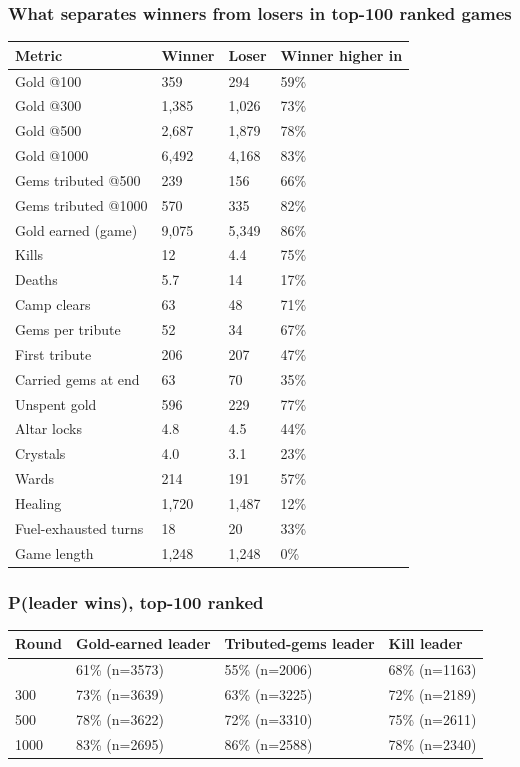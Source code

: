 \documentclass[
  10pt,
]{article}
\newcounter{none} %
\begin{document}
\subsubsection{What separates winners from losers in top-100 ranked
games}\label{what-separates-winners-from-losers-in-top-100-ranked-games-1}

{\def\LTcaptype{none} %
\begin{longtable}[]{@{}llll@{}}
\toprule\noalign{}
Metric & Winner & Loser & Winner higher in \\
\midrule\noalign{}
\endhead
\bottomrule\noalign{}
\endlastfoot
Gold @100 & 359 & 294 & 59\% \\
Gold @300 & 1,385 & 1,026 & 73\% \\
Gold @500 & 2,687 & 1,879 & 78\% \\
Gold @1000 & 6,492 & 4,168 & 83\% \\
Gems tributed @500 & 239 & 156 & 66\% \\
Gems tributed @1000 & 570 & 335 & 82\% \\
Gold earned (game) & 9,075 & 5,349 & 86\% \\
Kills & 12 & 4.4 & 75\% \\
Deaths & 5.7 & 14 & 17\% \\
Camp clears & 63 & 48 & 71\% \\
Gems per tribute & 52 & 34 & 67\% \\
First tribute & 206 & 207 & 47\% \\
Carried gems at end & 63 & 70 & 35\% \\
Unspent gold & 596 & 229 & 77\% \\
Altar locks & 4.8 & 4.5 & 44\% \\
Crystals & 4.0 & 3.1 & 23\% \\
Wards & 214 & 191 & 57\% \\
Healing & 1,720 & 1,487 & 12\% \\
Fuel-exhausted turns & 18 & 20 & 33\% \\
Game length & 1,248 & 1,248 & 0\% \\
\end{longtable}
}

\subsubsection{P(leader wins), top-100
ranked}\label{pleader-wins-top-100-ranked-1}

{\def\LTcaptype{none} %
\begin{longtable}[]{@{}llll@{}}
\toprule\noalign{}
Round & Gold-earned leader & Tributed-gems leader & Kill leader \\
\midrule\noalign{}
\endhead
\bottomrule\noalign{}
\endlastfoot
100 & 61\% (n=3573) & 55\% (n=2006) & 68\% (n=1163) \\
300 & 73\% (n=3639) & 63\% (n=3225) & 72\% (n=2189) \\
500 & 78\% (n=3622) & 72\% (n=3310) & 75\% (n=2611) \\
1000 & 83\% (n=2695) & 86\% (n=2588) & 78\% (n=2340) \\
\end{longtable}
}
\end{document}
